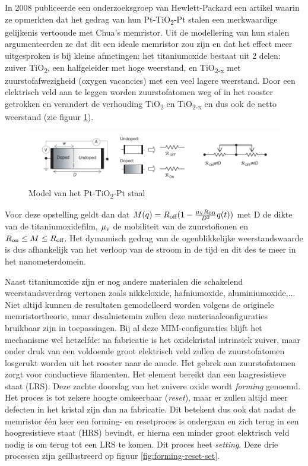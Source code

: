In 2008 publiceerde een onderzoeksgroep van Hewlett-Packard een artikel waarin ze opmerkten dat het gedrag van hun Pt-TiO\textsubscript{2}-Pt stalen een merkwaardige gelijkenis vertoonde met Chua's memristor.\cite{Str08} Uit de modellering van hun stalen argumenteerden ze dat dit een ideale memristor zou zijn en dat het effect meer uitgesproken is bij kleine afmetingen: het titaniumoxide bestaat uit 2 delen: zuiver TiO\textsubscript{2}, een halfgeleider met hoge weerstand, en TiO\textsubscript{2-x} met zuurstofafwezigheid (oxygen vacancies) met een veel lagere weerstand. Door een elektrisch veld aan te leggen worden zuurstofatomen weg of in het rooster getrokken en verandert de verhouding TiO\textsubscript{2} en TiO\textsubscript{2-x} en dus ook de netto weerstand (zie figuur \ref{fig:HP-model}).

\begin{figure}
  \centering
  \includegraphics[scale=0.5]{../fig/hfdstk-cel-HP-model.png}
  \caption{Model van het Pt-TiO\textsubscript{2}-Pt staal \cite{Str08}}
  \label{fig:HP-model}
\end{figure}

Voor deze opstelling geldt dan dat $M(q)=R\textsubscript{off}(1-\frac{\mu\textsubscript{v}R\textsubscript{on}}{D^2}q(t))$ met D de dikte van de titaniumoxidefilm, $\mu\textsubscript{v}$ de mobiliteit van de zuurstofionen en $R\textsubscript{on} \leq M \leq R\textsubscript{off}$. Het dymamisch gedrag van de ogenblikkelijke weerstandswaarde is dus afhankelijk van het verloop van de stroom in de tijd en dit des te meer in het nanometerdomein.

Naast titaniumoxide zijn er nog andere materialen die schakelend weerstandsverdrag vertonen zoals nikkeloxide\cite{Bae04}, hafniumoxide\cite{Che11}, aluminiumoxide\cite{Kim06},... Niet altijd kunnen de resultaten gemodelleerd worden volgens de originele memristortheorie, maar desalnietemin zullen deze materiaalconfiguraties bruikbaar zijn in toepassingen.
Bij al deze MIM-configuraties blijft het mechanisme wel hetzelfde: na fabricatie is het oxidekristal intrinsiek zuiver, maar onder druk van een voldoende groot elektrisch veld zullen de zuurstofatomen losgerukt worden uit het rooster naar de anode. Het gebrek aan zuurstofatomen zorgt voor conductieve filamenten. Het element bereikt dan een laagresistieve staat (LRS).
Deze zachte doorslag van het zuivere oxide wordt \emph{forming} genoemd. Het proces is tot zekere hoogte omkeerbaar (\emph{reset}), maar er zullen altijd meer defecten in het kristal zijn dan na fabricatie. Dit betekent dus ook dat nadat de memristor één keer een forming- en resetproces is ondergaan en zich terug in een hoogresistieve staat (HRS) bevindt, er hierna een minder groot elektrisch veld nodig is om terug tot een LRS te komen. Dit proces heet \emph{setting}. Deze drie processen zijn geïllustreerd op figuur \ref{fig:forming-reset-set}.

